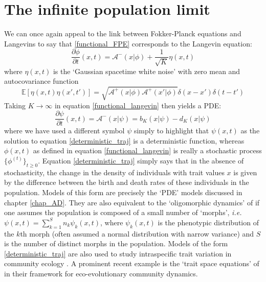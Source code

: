 \section{The infinite population limit}
We can once again appeal to the link between Fokker-Planck equations and Langevins \citep{lafuerza_role_2016} to say that \eqref{functional_FPE} corresponds to the Langevin equation:
\begin{equation}
\label{functional_langevin}
    \frac{\partial \phi}{\partial t}(x,t) = \mathcal{A}^{-}(x|\phi) + \frac{1}{\sqrt{K}}\eta(x,t)
\end{equation}
where $\eta(x,t)$  is the `Gaussian spacetime white noise' with zero mean and autocovariance function
\begin{equation*}
    \mathbb{E}[\eta(x,t)\eta(x',t')] = \sqrt{\mathcal{A}^{+}(x|\phi)\mathcal{A}^{+}(x'|\phi)}\delta(x-x')\delta(t-t')
\end{equation*}
Taking $K \to \infty$ in equation \eqref{functional_langevin} then yields a PDE:
\begin{equation}
\label{deterministic_traj}
\frac{\partial \psi}{\partial t}(x,t) = \mathcal{A}^{-}\left(x|\psi\right) = b_K(x|\psi)- d_K(x|\psi)
\end{equation}
where we have used a different symbol $\psi$ simply to highlight that $\psi(x,t)$ as the solution to equation \eqref{deterministic_traj} is a deterministic function, whereas $\phi(x,t)$ as defined in equation \eqref{functional_langevin} is really a stochastic process $\{\phi^{(t)}\}_{t\geq0}$. Equation \eqref{deterministic_traj} simply says that in the absence of stochasticity, the change in the density of individuals with trait values $x$ is given by the difference between the birth and death rates of these individuals in the population. Models of this form are precisely the `PDE' models discussed in chapter \ref{chap_AD}. They are also equivalent to the `oligomorphic dynamics' of \citep{sasaki_oligomorphic_2011, lion_multimorph_2022} if one assumes the population is composed of a small number of `morphs', \emph{i.e.} $\psi(x,t) = \sum\limits_{k=1}^{S} n_{k}\psi_k(x,t)$, where $\psi_k(x,t)$ is the phenotypic distribution of the $k$th morph (often assumed a normal distribution with narrow variance) and $S$ is the number of distinct morphs in the population. Models of the form \eqref{deterministic_traj} are also used to study intraspecific trait variation in community ecology \citep{nordbotten_dynamics_2020}. A prominent recent example is the `trait space equations' of \citep{wickman_theoretical_2022} in their framework for eco-evolutionary community dynamics.\\
